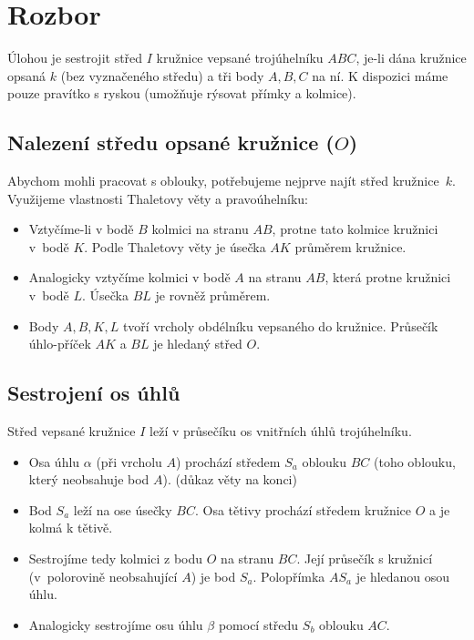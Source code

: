 \documentclass{MO}
\author{Dominik Dembinný}
\begin{document}
\makeMOheader

\section*{Rozbor}
Úlohou je sestrojit střed $I$ kružnice vepsané trojúhelníku $ABC$,
je-li dána kružnice opsaná $k$ (bez vyznačeného středu) a tři body $A, B, C$ na ní.
K dispozici máme pouze pravítko s ryskou (umožňuje rýsovat přímky a kolmice).

\subsection*{Nalezení středu opsané kružnice ($O$)}
Abychom mohli pracovat s oblouky, potřebujeme nejprve najít střed kružnice~$k$. Využijeme vlastnosti Thaletovy věty a pravoúhelníku:
\begin{itemize}
    \item Vztyčíme-li v bodě $B$ kolmici na stranu $AB$, protne tato kolmice kružnici v~bodě $K$. Podle Thaletovy věty je úsečka $AK$ průměrem kružnice.
    \item Analogicky vztyčíme kolmici v bodě $A$ na stranu $AB$, která protne kružnici v~bodě $L$. Úsečka $BL$ je rovněž průměrem.
    \item Body $A, B, K, L$ tvoří vrcholy obdélníku vepsaného do kružnice. Průsečík úhlo-příček $AK$ a $BL$ je hledaný střed $O$.
\end{itemize}

\subsection*{Sestrojení os úhlů}
Střed vepsané kružnice $I$ leží v průsečíku os vnitřních úhlů trojúhelníku.
\begin{itemize}
    \item Osa úhlu $\alpha$ (při vrcholu $A$) prochází středem $S_a$ oblouku $BC$ (toho oblouku, který neobsahuje bod $A$). (důkaz věty na konci)
    \item Bod $S_a$ leží na ose úsečky $BC$. Osa tětivy prochází středem kružnice $O$ a je kolmá k tětivě.
    \item Sestrojíme tedy kolmici z bodu $O$ na stranu $BC$. Její průsečík s kružnicí (v~polorovině neobsahující $A$) je bod $S_a$. Polopřímka $AS_a$ je hledanou osou úhlu.
    \item Analogicky sestrojíme osu úhlu $\beta$ pomocí středu $S_b$ oblouku $AC$.
\end{itemize}
\end{document}
